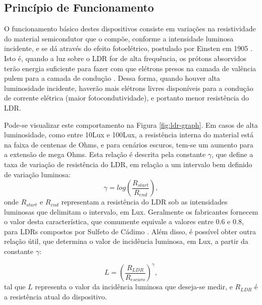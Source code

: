 \documentclass[oneside,openright,12pt]{ufsm_2015} %
\begin{document}
\subsection{Princípio de Funcionamento}
O funcionamento básico destes dispositivos consiste em variações na resistividade do material semicondutor que o compõe, conforme a intensidade luminosa incidente, e se dá através do efeito fotoelétrico,  postulado por Einsten em 1905 \cite{klassen2011photoelectric}. Isto é, quando a luz sobre o LDR for de alta frequência, os prótons absorvidos terão energia suficiente para fazer com que elétrons presos na camada de valência pulem para a camada de condução \cite{ibrahim2016automated}. Dessa forma, quando houver alta luminosidade incidente, haverão mais elétrons livres disponíveis para a condução de corrente elétrica (maior fotocondutividade), e portanto menor resistência do LDR.

Pode-se visualizar este comportamento na Figura \ref{fig:ldr-graph}. Em casos de alta luminosidade, como entre 10Lux e 100Lux, a resistência interna do material está na faixa de centenas de Ohms, e para cenários escuros, tem-se um aumento para a extensão de mega Ohms. Esta relação é descrita pela constante $\gamma$, que define a taxa de variação de resistência do LDR, em relação a um intervalo bem definido de variação luminosa:
\begin{equation}
    \gamma = log(\frac {R_{start}}{R_{end}}),
\end{equation}
onde $R_{start}$ e $R_{end}$ representam a resistência do LDR sob as intensidades luminosas que delimitam o intervalo, em Lux. Geralmente os fabricantes fornecem o valor desta característica, que comumente equivale a valores entre 0.6 e 0.8, para LDRs compostos por Sulfeto de Cádimo \cite{Lightdep67:online}. Além disso, é possível obter outra relação útil, que determina o valor de incidência luminosa, em Lux, a partir da constante $\gamma$:

\begin{equation}
    L = (\frac{R_{LDR}}{R_{escuro}})^\gamma ,
\end{equation}
tal que $L$ representa o valor da incidência luminosa que deseja-se medir, e $R_{LDR}$ é a resistência atual do dispositivo.
\end{document}
